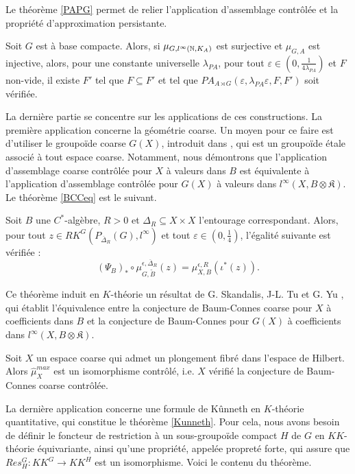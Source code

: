 Le théorème \ref{PAPG} permet de relier l'application d'assemblage contrôlée et la propriété d'approximation persistante. 

\begin{thm} 
Soit $G$ est à base compacte. Alors, si $\mu_{G,l^\infty(\mathbb N, K_A)}$ est surjective et $\mu_{G,A}$ est injective, alors, pour une constante universelle $\lambda_{PA}$, pour tout $\varepsilon \in(0,\frac{1}{4\lambda_{PA}})$ et $F$ non-vide, il existe $F'$ tel que $F\subseteq F'$ et tel que $PA_{A\rtimes G}(\varepsilon,\lambda_{PA}\varepsilon,F,F')$ soit vérifiée.
\end{thm}

La dernière partie se concentre sur les applications de ces constructions. La première application concerne la géométrie coarse. Un moyen pour ce faire est d'utiliser le groupoïde coarse $G(X)$, introduit dans \cite{SkTuYu}, qui est un groupoïde étale associé à tout espace coarse. Notamment, nous démontrons que l'application d'assemblage coarse contrôlée pour $X$ à valeurs dans $B$ est équivalente à l'application d'assemblage contrôlée pour $G(X)$ à valeurs dans $l^\infty(X,B\otimes\mathfrak K)$. Le théorème \ref{BCCeq} est le suivant.

\begin{thm}
Soit $B$ une $C^*$-algèbre, $R>0$ et $\Delta_R\subseteq X\times X$ l'entourage correspondant. Alors, pour tout $z\in RK^G(P_{\overline \Delta_R}(G),l^\infty)$ et tout $\varepsilon\in(0,\frac{1}{4})$, l'égalité suivante est vérifiée :
\[(\Psi_B)_*\circ\mu^{\epsilon,\overline\Delta_R}_{G,\tilde B} (z) = \mu_{X,B}^{\epsilon,R}(\iota^*(z)).\]
\end{thm}

Ce théorème induit en $K$-théorie un résultat de G. Skandalis, J-L. Tu et G. Yu \cite{SkTuYu}, qui établit l'équivalence entre la conjecture de Baum-Connes coarse pour $X$ à coefficients dans $B$ et la conjecture de Baum-Connes pour $G(X)$ à coefficients dans $l^\infty(X,B\otimes \mathfrak K)$. \\

\begin{cor}
Soit $X$ un espace coarse qui admet un plongement fibré dans l'espace de Hilbert. Alors $\hat \mu_{X}^{max}$ est un isomorphisme contrôlé, i.e. $X$ vérifié la conjecture de Baum-Connes coarse contrôlée.
\end{cor}

La dernière application concerne une formule de Kûnneth en $K$-théorie quantitative, qui constitue le théorème \ref{Kunneth}. Pour cela, nous avons besoin de définir le foncteur de restriction à un sous-groupoïde compact $H$ de $G$ en $KK$-théorie équivariante, ainsi qu'une propriété, appelée propreté forte, qui assure que $Res_H^G : KK^G \rightarrow KK^H$ est un isomorphisme. Voici le contenu du théorème.

